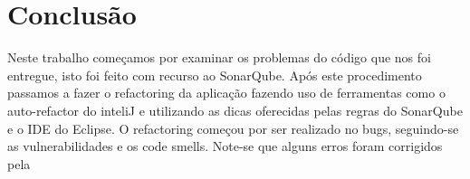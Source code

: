 \vspace{1cm}
\section{Conclusão}

Neste trabalho começamos por examinar os problemas do código que nos foi entregue, isto foi feito com recurso ao SonarQube. Após este procedimento passamos a fazer o refactoring da aplicação fazendo uso de ferramentas como o auto-refactor do inteliJ e utilizando as dicas oferecidas pelas regras do SonarQube e o IDE do Eclipse. O refactoring começou por ser realizado no bugs, seguindo-se as vulnerabilidades e os code smells. Note-se que alguns erros foram corrigidos pela 
